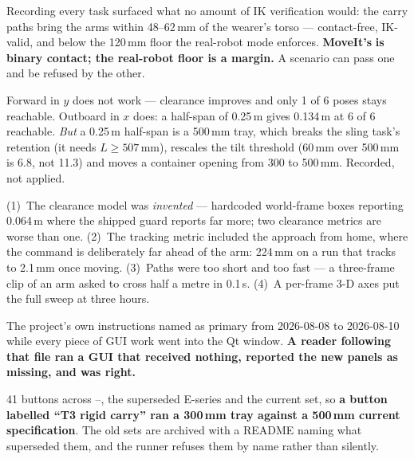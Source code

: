 
{Recording every task surfaced what no amount of IK verification would: the
carry paths bring the arms within 48--62\,mm of the wearer's torso ---
contact-free, IK-valid, and below the 120\,mm floor the real-robot mode
enforces. \textbf{MoveIt's}  \textbf{is binary contact;
the real-robot floor is a margin.} A scenario can pass one and be refused by the
other.}

{Forward in $y$ does not work --- clearance improves and only 1 of 6 poses stays
reachable. Outboard in $x$ does: a half-span of 0.25\,m gives 0.134\,m at 6 of 6
reachable. \textit{But} a 0.25\,m half-span is a 500\,mm tray, which breaks the
sling task's retention (it needs $L \ge 507$\,mm), rescales the tilt threshold
(60\,mm over 500\,mm is 6.8\dg, not 11.3\dg) and moves a container opening from
300 to 500\,mm. Recorded, not applied.}

{(1)~The clearance model was \emph{invented} --- hardcoded world-frame boxes
reporting 0.064\,m where the shipped guard reports far more; two clearance
metrics are worse than one. (2)~The tracking metric included the approach from
home, where the command is deliberately far ahead of the arm: 224\,mm on a run
that tracks to 2.1\,mm once moving. (3)~Paths were too short and too fast --- a
three-frame clip of an arm asked to cross half a metre in 0.1\,s. (4)~A
per-frame 3-D axes put the full sweep at three hours.}

{The project's own instructions named  as primary from 2026-08-08
to 2026-08-10 while every piece of GUI work went into the Qt window. \textbf{A
reader following that file ran a GUI that received nothing, reported the new
panels as missing, and was right.}}

{41 buttons across --, the superseded E-series and the current
set, so \textbf{a button labelled ``T3 rigid carry'' ran a 300\,mm tray against
a 500\,mm current specification}. The old sets are archived with a README naming
what superseded them, and the runner refuses them by name rather than silently.}

